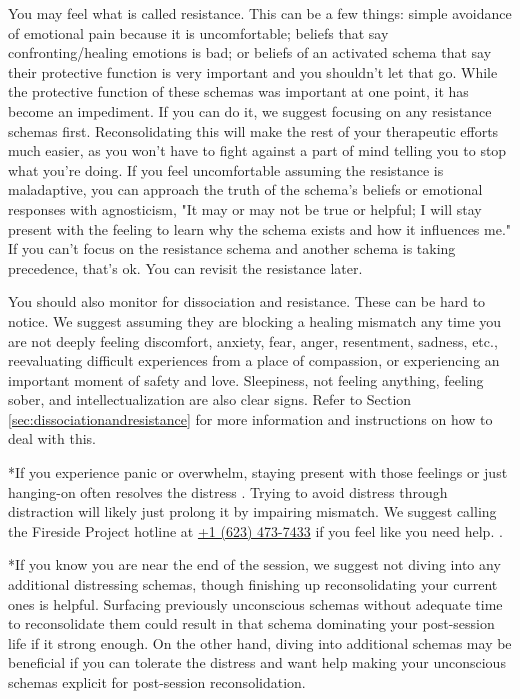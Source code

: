 \documentclass[12pt,letterpaper]{book}
\begin{document}
You may feel what is called resistance. This can be a few things: simple avoidance of emotional pain because it is uncomfortable; beliefs that say confronting/healing emotions is bad; or beliefs of an activated schema that say their protective function is very important and you shouldn't let that go. While the protective function of these schemas was important at one point, it has become an impediment. If you can do it, we suggest focusing on any resistance schemas first. Reconsolidating this will make the rest of your therapeutic efforts much easier, as you won't have to fight against a part of mind telling you to stop what you're doing. If you feel uncomfortable assuming the resistance is maladaptive, you can approach the truth of the schema's beliefs or emotional responses with agnosticism, "It may or may not be true or helpful; I will stay present with the feeling to learn why the schema exists and how it influences me." If you can't focus on the resistance schema and another schema is taking precedence, that's ok. You can revisit the resistance later.

You should also monitor for dissociation and resistance. These can be hard to notice. We suggest assuming they are blocking a healing mismatch any time you are not deeply feeling discomfort, anxiety, fear, anger, resentment, sadness, etc., reevaluating difficult experiences from a place of compassion, or experiencing an important moment of safety and love. Sleepiness, not feeling anything, feeling sober, and intellectualization are also clear signs. Refer to Section \ref{sec:dissociationandresistance} for more information and instructions on how to deal with this.

*If you experience panic or overwhelm, staying present with those feelings or just hanging-on often resolves the distress \cite{mithoeferManual}. Trying to avoid distress through distraction will likely just prolong it by impairing mismatch. We suggest calling the Fireside Project hotline at \href{tel:1-623-473-7433}{+1 (623) 473-7433} if you feel like you need help. \cite{firesideProject}. 

*If you know you are near the end of the session, we suggest not diving into any additional distressing schemas, though finishing up reconsolidating your current ones is helpful. Surfacing previously unconscious schemas without adequate time to reconsolidate them could result in that schema dominating your post-session life if it strong enough. On the other hand, diving into additional schemas may be beneficial if you can tolerate the distress and want help making your unconscious schemas explicit for post-session reconsolidation.
\end{document}

